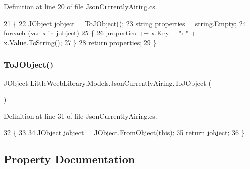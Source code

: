 Definition at line 20 of file Json\+Currently\+Airing.\+cs.


\begin{DoxyCode}
21         \{
22             JObject jobject = \mbox{\hyperlink{class_little_weeb_library_1_1_models_1_1_json_currently_airing_a17c6ec2452aff297f572ce2544c89370}{ToJObject}}();
23             \textcolor{keywordtype}{string} properties = \textcolor{keywordtype}{string}.Empty;
24             \textcolor{keywordflow}{foreach} (var x \textcolor{keywordflow}{in} jobject)
25             \{
26                 properties += x.Key + \textcolor{stringliteral}{": "} + x.Value.ToString();
27             \}
28             \textcolor{keywordflow}{return} properties;
29         \}
\end{DoxyCode}
\mbox{\label{class_little_weeb_library_1_1_models_1_1_json_currently_airing_a17c6ec2452aff297f572ce2544c89370}} 
\subsubsection{\texorpdfstring{To\+J\+Object()}{ToJObject()}}
{\footnotesize\ttfamily J\+Object Little\+Weeb\+Library.\+Models.\+Json\+Currently\+Airing.\+To\+J\+Object (\begin{DoxyParamCaption}{ }\end{DoxyParamCaption})}



Definition at line 31 of file Json\+Currently\+Airing.\+cs.


\begin{DoxyCode}
32         \{
33 
34             JObject jobject = JObject.FromObject(\textcolor{keyword}{this});
35             \textcolor{keywordflow}{return} jobject;
36         \}
\end{DoxyCode}


\subsection{Property Documentation}
\mbox{\label{class_little_weeb_library_1_1_models_1_1_json_currently_airing_a0a27db3207e9fb88e8258c86481d5d0a}} 
